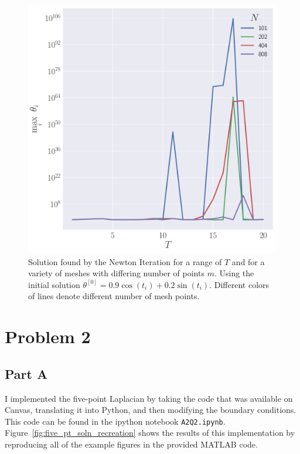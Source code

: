 \documentclass[12pt]{article}
\begin{document}
\begin{figure}
    \centering
    \includegraphics[clip,scale=0.3]{q1b_figure.pdf}
    \caption{
        Solution found by the Newton Iteration for a range of $T$ and for a variety of meshes with differing number of points $m$. Using the initial solution $\theta^{[0]}=0.9\cos(t_{i})+0.2\sin(t_{i})$. Different colors of lines denote different number of mesh points. 
    }
    \label{fig:q1b_scan}
\end{figure}

\section*{Problem 2}

\subsection*{Part A}
I implemented the five-point Laplacian by taking the code that was available on Canvas, translating it into Python, and then modifying the boundary conditions.
This code can be found in the ipython notebook \verb|A2Q2.ipynb|. Figure~\ref{fig:five_pt_soln_recreation} shows the results of this implementation by reproducing all of the example figures in the provided MATLAB code. 
\end{document}
